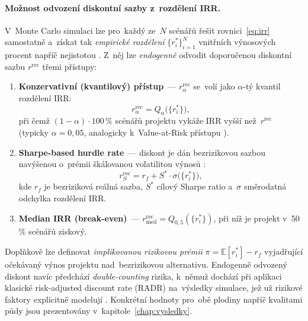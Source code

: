 \paragraph{Možnost odvození diskontní sazby z~rozdělení IRR.}
V~Monte Carlo simulaci lze pro~každý ze~$N$ scénářů řešit
rovnici~\eqref{eq:irr} samostatně a~získat tak \emph{empirické
rozdělení} $\{r_i^*\}_{i=1}^{N}$ vnitřních výnosových procent napříč
nejistotou \citep{Glasserman2003}. Z~něj lze \emph{endogenně} odvodit
doporučenou diskontní sazbu $r^{\text{rec}}$ třemi přístupy:

\begin{enumerate}
    \item \textbf{Konzervativní (kvantilový) přístup}~--- $r^{\text{rec}}_\alpha$
          se~volí jako $\alpha$-tý kvantil rozdělení IRR:
          \begin{equation}
              r^{\text{rec}}_\alpha = Q_\alpha\bigl(\{r_i^*\}\bigr),
              \label{eq:irr_quantile}
          \end{equation}
          při čemž $(1-\alpha) \cdot 100\,\%$ scénářů projektu vykáže IRR
          vyšší než~$r^{\text{rec}}$ (typicky $\alpha = 0{,}05$, analogicky
          k~Value-at-Risk přístupu \citep{Jorion2007}).

    \item \textbf{Sharpe-based hurdle rate}~--- diskont je dán bezrizikovou
          sazbou navýšenou o~prémii škálovanou volatilitou výnosů
          \citep{Sharpe1966}:
          \begin{equation}
              r^{\text{rec}}_S = r_f + S^* \cdot \sigma\bigl(\{r_i^*\}\bigr),
              \label{eq:irr_sharpe}
          \end{equation}
          kde $r_f$ je bezriziková reálná sazba, $S^*$ cílový Sharpe ratio
          a~$\sigma$ směrodatná odchylka rozdělení IRR.

    \item \textbf{Median IRR (break-even)}~--- $r^{\text{rec}}_{\text{med}}
          = Q_{0{,}5}(\{r_i^*\})$, při níž je projekt v~50\,\% scénářů
          ziskový.
\end{enumerate}

Doplňkově lze definovat \emph{implikovanou rizikovou prémii}
$\pi = \mathbb{E}[r_i^*] - r_f$ vyjadřující očekávaný výnos projektu
nad~bezrizikovou alternativu. Endogenně odvozený diskont navíc předchází
\emph{double-counting} rizika, k~němuž dochází při aplikaci klasické
risk-adjusted discount rate (RADR) na~výsledky simulace, jež už rizikové
faktory explicitně modelují \citep{Robichek1966,Damodaran2008}. Konkrétní
hodnoty pro~obě plodiny napříč kvalitami půdy jsou prezentovány
v~kapitole~\ref{chap:vysledky}.

